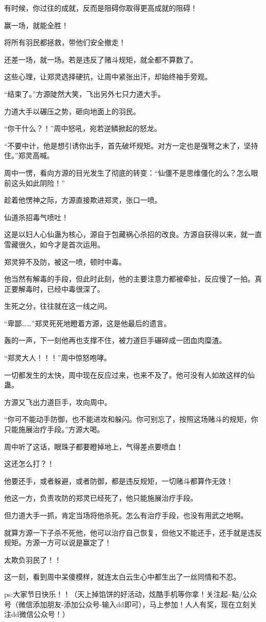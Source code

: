 \begin{this_body}
有时候，你过往的成就，反而是阻碍你取得更高成就的阻碍！

赢一场，就能全胜！

将所有羽民都拯救，带他们安全撤走！

还差一场，就一场。若是违反了赌斗规矩，就全都不算数了。

这些心理，让郑灵选择硬抗，让周中紧张出汗，却始终袖手旁观。

“结束了。”方源陡然大笑，飞出另外七只力道大手。

力道大手以碾压之势，砸向地面上的羽民。

“你干什么？！”周中怒吼，宛若逆鳞掀起的怒龙。

“不要中计，他是想引诱你出手，首先破坏规矩。对方一定也是强弩之末了，坚持住。”郑灵高喊。

周中一愣，看向方源的目光发生了彻底的转变：“仙僵不是思维僵化的么？怎么眼前这头如此阴险！”

趁着他愣神之际，方源直接欺进郑灵，张口一喷。

仙道杀招毒气喷吐！

这是以妇人心仙蛊为核心，源自于包藏祸心杀招的改良。方源自获得以来，就一直雪藏很久，如今才是首次运用。

郑灵猝不及防，被这一喷，顿时中毒。

他当然有解毒的手段，但此时此刻，他的主要注意力都被牵扯，反应慢了一拍。真正要解毒时，已经中毒很深了。

生死之分，往往就在这一线之间。

“卑鄙……”郑灵死死地瞪着方源，这是他最后的遗言。

轰的一声，下一刻他再也支撑不住，被力道巨手碾碎成一团血肉糜渣。

“郑灵大人！！！”周中惊怒咆哮。

一切都发生的太快，周中现在反应过来，也来不及了。他可没有人如故这样的仙蛊。

方源又飞出力道巨手，攻向周中。

“你可不能动手防御，也不能进攻和躲闪。你可别忘了，按照这场赌斗的规矩，你只能施展治疗手段。”方源大喝。

周中听了这话，眼珠子都要瞪掉地上，气得差点要喷血！

这还怎么打？！

他要还手，或者躲避，或者防御，都是违反规矩，一切赌斗都算作无效！

他这一方，负责攻防的郑灵已经死了，他只能施展治疗手段。

但力道大手一抓，肯定当场将他杀死。怎么有治疗手段，也没有用武之地啊。

就算方源一下子杀不死他，他可以治疗自己恢复，但他又不能还手，还手就是违反规矩。方源一方可以说是赢定了！

太欺负羽民了！！

这一刻，看到周中呆傻模样，就连太白云生心中都生出了一丝同情和不忍。

ps:大家节日快乐！！（天上掉馅饼的好活动，炫酷手机等你拿！关注起\~{}點/公众号（微信添加朋友-添加公众号-输入dd即可），马上参加！人人有奖，现在立刻关注dd微信公众号！）

\end{this_body}

